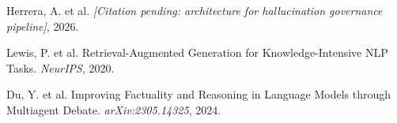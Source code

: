 
Herrera, A. et al. \textit{[Citation pending: architecture for hallucination governance pipeline]}, 2026.

Lewis, P. et al. Retrieval-Augmented Generation for Knowledge-Intensive NLP Tasks. \textit{NeurIPS}, 2020.

Du, Y. et al. Improving Factuality and Reasoning in Language Models through Multiagent Debate. \textit{arXiv:2305.14325}, 2024.
